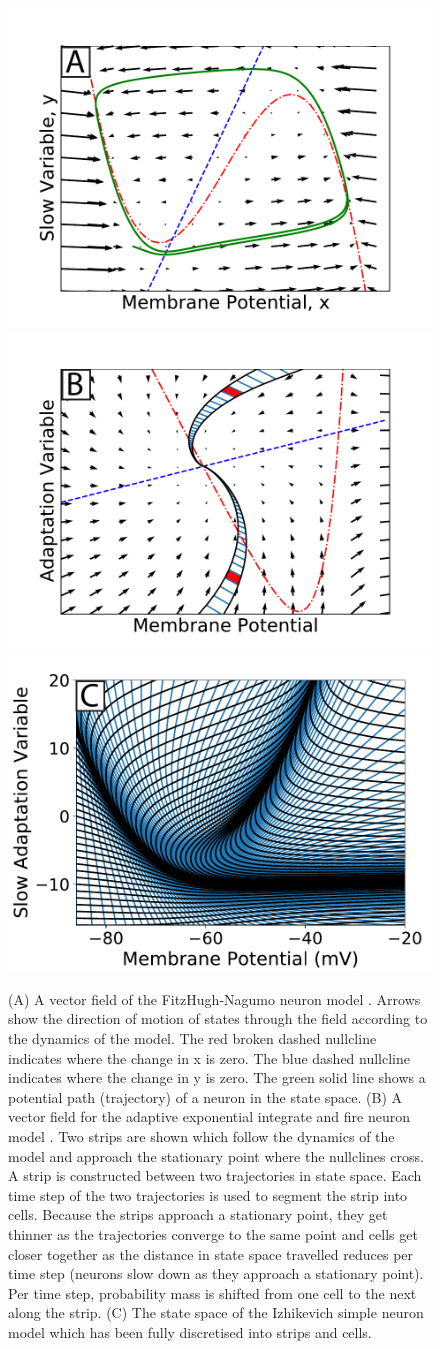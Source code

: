 \documentclass[utf8]{frontiersSCNS} %
\begin{document}
\begin{figure}[!htb]
  \centering
  \includegraphics[width=0.47\columnwidth]{images/fn_vector_field.pdf}
  \includegraphics[width=0.47\columnwidth]{images/aexp_single_strip.pdf}
  \includegraphics[width=0.45\columnwidth]{images/izh_mesh_empty.pdf}
  \caption{(A) A vector field of the FitzHugh-Nagumo neuron model \citep{fitzhugh1961impulses}. Arrows show the direction of motion of states through the field according to the dynamics of the model. The red broken dashed nullcline indicates where the change in x is zero. The blue dashed nullcline indicates where the change in y is zero. The green solid line shows a potential path (trajectory) of a neuron in the state space. (B) A vector field for the adaptive exponential integrate and fire neuron model \citep{brette2005}. Two strips are shown which follow the dynamics of the model and approach the stationary point where the nullclines cross. A strip is constructed between two trajectories in state space. Each time step of the two trajectories is used to segment the strip into cells. Because the strips approach a stationary point, they get thinner as the trajectories converge to the same point and cells get closer together as the distance in state space travelled reduces per time step (neurons slow down as they approach a stationary point). Per time step, probability mass is shifted from one cell to the next along the strip. (C) The state space of the Izhikevich simple neuron model \citep{izhikevich2003simple} which has been fully discretised into strips and cells.}
  \label{fig:strip}
\end{figure}
\end{document}
